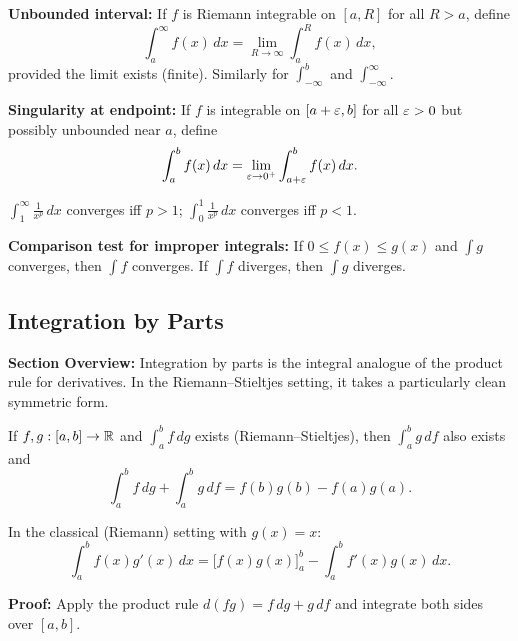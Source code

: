 \documentclass[../master/master.tex]{subfiles}
\begin{document}
\begin{definition}
\textbf{Unbounded interval:} If $f$ is Riemann integrable on $[a, R]$ for all $R > a$, define
\[
    \int_a^{\infty} f(x)\, dx = \lim_{R \to \infty} \int_a^R f(x)\, dx,
\]
provided the limit exists (finite). Similarly for $\int_{-\infty}^b$ and $\int_{-\infty}^{\infty}$.

\textbf{Singularity at endpoint:} If $f$ is integrable on $[a+\varepsilon, b]$ for all $\varepsilon > 0$ but possibly unbounded near $a$, define
\[
    \int_a^b f(x)\, dx = \lim_{\varepsilon \to 0^+} \int_{a+\varepsilon}^b f(x)\, dx.
\]
\end{definition}

\begin{example}
$\displaystyle\int_1^{\infty} \frac{1}{x^p}\, dx$ converges iff $p > 1$; $\displaystyle\int_0^1 \frac{1}{x^p}\, dx$ converges iff $p < 1$.
\end{example}

\begin{notebox}
\textbf{Comparison test for improper integrals:} If $0 \leq f(x) \leq g(x)$ and $\int g$ converges, then $\int f$ converges. If $\int f$ diverges, then $\int g$ diverges.
\end{notebox}

\subsection{Integration by Parts}

\begin{summarybox}
\textbf{Section Overview:} Integration by parts is the integral analogue of the product rule for derivatives. In the Riemann--Stieltjes setting, it takes a particularly clean symmetric form.
\end{summarybox}

\begin{theorem}
If $f, g: [a,b] \to \mathbb{R}$ and $\int_a^b f\, dg$ exists (Riemann--Stieltjes), then $\int_a^b g\, df$ also exists and
\[
    \int_a^b f\, dg + \int_a^b g\, df = f(b)g(b) - f(a)g(a).
\]
\end{theorem}

In the classical (Riemann) setting with $g(x) = x$:
\[
    \int_a^b f(x) g'(x)\, dx = \bigl[f(x)g(x)\bigr]_a^b - \int_a^b f'(x) g(x)\, dx.
\]

\begin{notebox}
\textbf{Proof:} Apply the product rule $d(fg) = f\, dg + g\, df$ and integrate both sides over $[a,b]$.
\end{notebox}
\end{document}

